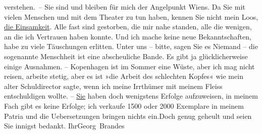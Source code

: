 \begin{ledgroupsized}[t]{13cm}
               verstehen. – Sie sind und bleiben für mich der Angelpunkt Wiens. Da Sie mit vielen Menschen und mit dem Theater zu tun
               haben, kennen Sie nicht mein Loos, \uline{die Einsamkeit}.
               Alle fast sind gestorben, die mir nahe standen, alle {\pb}die wenigen, an die ich Vertrauen
               haben konnte. Und ich mache keine neue Bekanntschaften, habe zu viele Täuschungen
               erlitten. Unter uns – bitte, sagen Sie es Niemand – die sogenannte Menschheit ist
               eine abscheuliche Bande. Es gibt ja glücklicherweise einige Ausnahmen. – Kopenhagen ist im Sommer eine Wüste, aber ich
               mag nicht reisen, arbeite stetig, aber es ist »die Arbeit des schlechten Kopfes« wie
               mein alter Schuldirector
               sagte, wenn ich meine Irrthümer mit meinem Fleiss entschuldigen wollte. – \uline{Sie} haben doch wenigstens Erfolge aufzuweisen, in
               meinem Fach gibt es keine Erfolge; ich verkaufe 1500 oder 2000 Exemplare in meinem
               Patria und die Uebersetzungen bringen nichts ein.\hspace*{2em}Doch genug geheult und seien Sie innigst bedankt. Ihr\spacefill\mbox{Georg Brandes}\pend
           
         
         \endnumbering{}\end{ledgroupsized}  \newcommand{\dateiname}{L02445}\newcommand{\titel}{Georg Brandes an Arthur Schnitzler, 12. 7. 1925}\newcommand{\editorInnen}{Martin Anton Müller und Gerd-Hermann Susen}
      